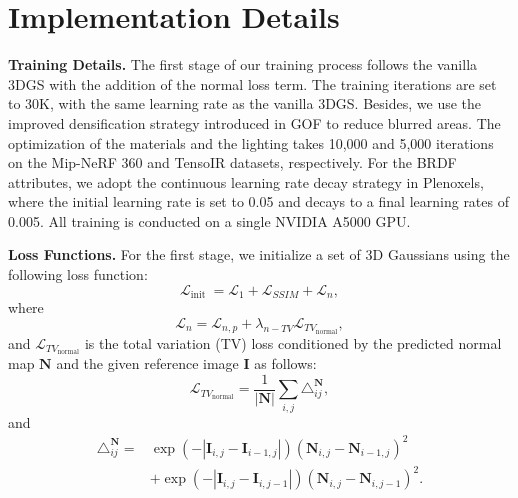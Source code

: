 \documentclass{article} %
\begin{document}
\section{Implementation Details}\label{appendix_imple}

\textbf{Training Details.} The first stage of our training process follows the vanilla 3DGS with the addition of the normal loss term. The training iterations are set to 30K, with the same learning rate as the vanilla 3DGS. Besides, we use the improved densification strategy introduced in GOF \citep{gof} to reduce blurred areas. The optimization of the materials and the lighting takes 10,000 and 5,000 iterations on the Mip-NeRF 360 and TensoIR datasets, respectively. For the BRDF attributes, we adopt the continuous learning rate decay strategy in Plenoxels\citep{fridovich2022plenoxels}, where the initial learning rate is set to 0.05 and decays to a final learning rates of 0.005. All training is conducted on a single NVIDIA A5000 GPU.

\textbf{Loss Functions.}
For the first stage, we initialize a set of 3D Gaussians using the following loss function:
\begin{equation}
\mathcal{L}_{\text {init }} =\mathcal{L}_1+\mathcal{L}_{SSIM}+\mathcal{L}_n, 
\end{equation}
where 
\begin{equation}
    \mathcal{L}_n =\mathcal{L}_{n,p}+\lambda_{n-T V} \mathcal{L}_{TV_\text{normal}},
\end{equation}
and $\mathcal{L}_{TV_\text{normal}}$ is the total variation (TV) loss conditioned by the predicted normal map $\boldsymbol{N}$ and the given reference image $\boldsymbol{I}$ as follows:
\begin{equation}
    \mathcal{L}_{TV_\text{normal}}  =\frac{1}{|\boldsymbol{N}|} \sum_{i, j} \triangle_{i j}^{\bm{N}},
\end{equation}
and
\begin{equation}
    \begin{aligned}
\triangle_{i j}^{\bm{N}}= & \exp \left(-\left|\boldsymbol{I}_{i, j}-\boldsymbol{I}_{i-1, j}\right|\right)\left(\boldsymbol{N}_{i, j}-\boldsymbol{N}_{i-1, j}\right)^2 \\
&+\exp \left(-\left|\boldsymbol{I}_{i, j}-\boldsymbol{I}_{i, j-1}\right|\right)\left(\boldsymbol{N}_{i, j}-\boldsymbol{N}_{i, j-1}\right)^2. \\
\end{aligned}
\end{equation}
\end{document}
